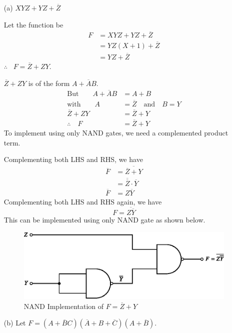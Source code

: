 \begin{solution}
\begin{itemize}
\item[(a)] $XYZ+YZ+\overline{Z}$

Let the function be
\begin{align*}
F &= XYZ+YZ+\overline{Z}\\[5pt]
  &= YZ(X+1)+\overline{Z}\\[5pt]
  &= YZ+\overline{Z}
\end{align*}
$\therefore$~ $F=\overline{Z}+ZY$.

\eject

$\overline{Z}+ZY$ is of the form $A+\overline{A}B$.
\begin{align*}
\text{But}\qquad A+\overline{A}B &=A+B\\[4pt]
\text{with}\qquad A &=\overline{Z}\quad\text{and}\quad B=Y\\[4pt]
\overline{Z}+ZY &=\overline{Z}+Y\\[4pt]
\therefore\quad F &= \overline{Z}+Y
\end{align*}
To implement using only NAND gates, we need a complemented product term.

Complementing both LHS and RHS, we have
\begin{align*}
\overline{F} &= \overline{\overline{Z}+Y}\\[4pt]
             &= \overline{\overline{Z}}\cdot \overline{Y}\\[4pt]
\overline{F} &= Z\overline{Y}
\end{align*}
Complementing both LHS and RHS again, we have
$$
F=\overline{Z\overline{Y}}
$$
This can be implemented using only NAND gate as shown below.
\begin{figure}[H]
\centering
\includegraphics{chap6/fig114.eps}
\caption*{NAND Implementation of $F=\overline{Z}+Y$}
\end{figure}

\item[(b)] Let $F=(A+\overline{B}C)(\overline{A}+B+\overline{C})(A+\overline{B})$.


\end{itemize}
\end{solution}
